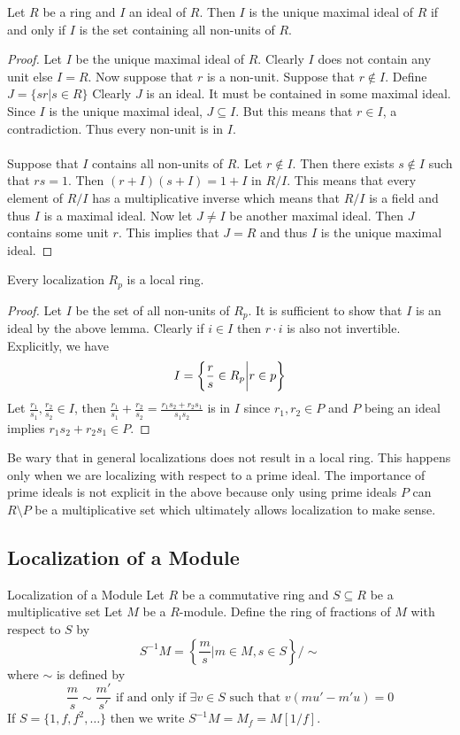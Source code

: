 \documentclass[a4paper]{article}
\begin{document}
\begin{prp}{}{} Let $R$ be a ring and $I$ an ideal of $R$. Then $I$ is the unique maximal ideal of $R$ if and only if $I$ is the set containing all non-units of $R$. \tcbline
\begin{proof}
Let $I$ be the unique maximal ideal of $R$. Clearly $I$ does not contain any unit else $I=R$. Now suppose that $r$ is a non-unit. Suppose that $r\notin I$. Define $J=\{sr|s\in R\}$ Clearly $J$ is an ideal. It must be contained in some maximal ideal. Since $I$ is the unique maximal ideal, $J\subseteq I$. But this means that $r\in I$, a contradiction. Thus every non-unit is in $I$. \\~\\
Suppose that $I$ contains all non-units of $R$. Let $r\notin I$. Then there exists $s\notin I$ such that $rs=1$. Then $(r+I)(s+I)=1+I$ in $R/I$. This means that every element of $R/I$ has a multiplicative inverse which means that $R/I$ is a field and thus $I$ is a maximal ideal. Now let $J\neq I$ be another maximal ideal. Then $J$ contains some unit $r$. This implies that $J=R$ and thus $I$ is the unique maximal ideal. 
\end{proof}
\end{prp}

\begin{prp}{}{} Every localization $R_p$ is a local ring. \tcbline
\begin{proof}
Let $I$ be the set of all non-units of $R_p$. It is sufficient to show that $I$ is an ideal by the above lemma. Clearly if $i\in I$ then $r\cdot i$ is also not invertible. Explicitly, we have $$I=\left\{\frac{r}{s}\in R_p\bigg{|}r\in p\right\}$$ Let $\frac{r_1}{s_1},\frac{r_2}{s_2}\in I$, then $\frac{r_1}{s_1}+\frac{r_2}{s_2}=\frac{r_1s_2+r_2s_1}{s_1s_2}$ is in $I$ since $r_1,r_2\in P$ and $P$ being an ideal implies $r_1s_2+r_2s_1\in P$. 
\end{proof}
\end{prp}

Be wary that in general localizations does not result in a local ring. This happens only when we are localizing with respect to a prime ideal. The importance of prime ideals is not explicit in the above because only using prime ideals $P$ can $R\setminus P$ be a multiplicative set which ultimately allows localization to make sense. 

\subsection{Localization of a Module}
\begin{defn}{Localization of a Module}{} Let $R$ be a commutative ring and $S\subseteq R$ be a multiplicative set Let $M$ be a $R$-module. Define the ring of fractions of $M$ with respect to $S$ by $$S^{-1}M=\left\{\frac{m}{s}|m\in M,s\in S\right\}/\sim$$ where $\sim$ is defined by $$\frac{m}{s}\sim\frac{m'}{s'}\text{ if and only if }\exists v\in S\text{ such that }v(mu'-m'u)=0$$
If $S=\{1,f,f^2,\dots\}$ then we write $S^{-1}M=M_f=M[1/f]$. 
\end{defn}
\end{document}

